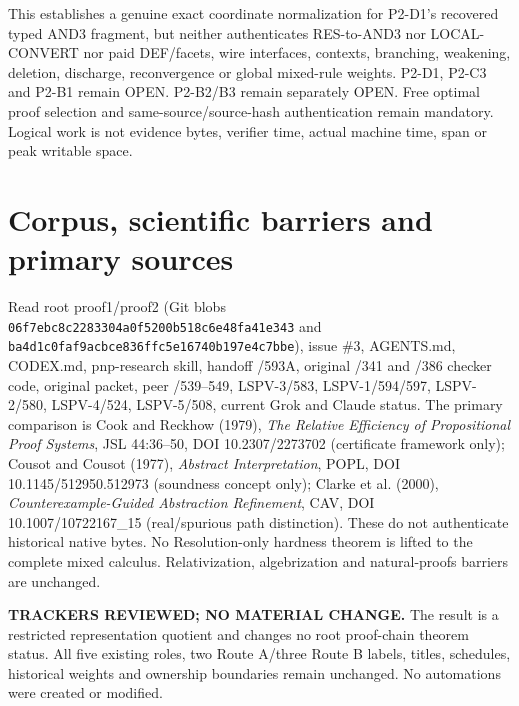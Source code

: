 \documentclass[11pt]{article}
\begin{document}
\noindent This establishes a genuine exact coordinate normalization for P2-D1's recovered typed AND3 fragment, but neither authenticates RES-to-AND3 nor LOCAL-CONVERT nor paid DEF/facets, wire interfaces, contexts, branching, weakening, deletion, discharge, reconvergence or global mixed-rule weights. P2-D1, P2-C3 and P2-B1 remain OPEN. P2-B2/B3 remain separately OPEN. Free optimal proof selection and same-source/source-hash authentication remain mandatory. Logical work is not evidence bytes, verifier time, actual machine time, span or peak writable space.

\section*{Corpus, scientific barriers and primary sources}
\noindent Read root proof1/proof2 (Git blobs \texttt{06f7ebc8c2283304a0f5200b518c6e48fa41e343} and \texttt{ba4d1c0faf9acbce836ffc5e16740b197e4c7bbe}), issue \#3, AGENTS.md, CODEX.md, pnp-research skill, handoff /593A, original /341 and /386 checker code, original packet, peer /539--549, LSPV-3/583, LSPV-1/594/597, LSPV-2/580, LSPV-4/524, LSPV-5/508, current Grok and Claude status. The primary comparison is Cook and Reckhow (1979), \emph{The Relative Efficiency of Propositional Proof Systems}, JSL 44:36--50, DOI 10.2307/2273702 (certificate framework only); Cousot and Cousot (1977), \emph{Abstract Interpretation}, POPL, DOI 10.1145/512950.512973 (soundness concept only); Clarke et al. (2000), \emph{Counterexample-Guided Abstraction Refinement}, CAV, DOI 10.1007/10722167\_15 (real/spurious path distinction). These do not authenticate historical native bytes. No Resolution-only hardness theorem is lifted to the complete mixed calculus. Relativization, algebrization and natural-proofs barriers are unchanged.

\noindent\textbf{TRACKERS REVIEWED; NO MATERIAL CHANGE.} The result is a restricted representation quotient and changes no root proof-chain theorem status. All five existing roles, two Route A/three Route B labels, titles, schedules, historical weights and ownership boundaries remain unchanged. No automations were created or modified.
\end{document}
